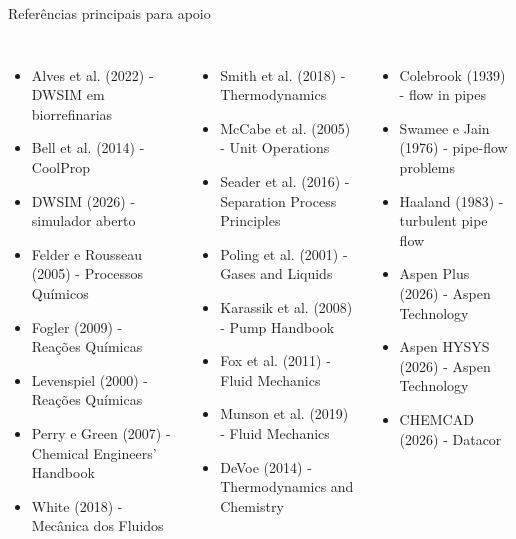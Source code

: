 \begin{frame}{Referências principais para apoio}
  \tiny
  \begin{columns}[T,onlytextwidth]
      \begin{itemize}\setlength{\itemsep}{0.15em}
        \item Alves et al. (2022) - DWSIM em biorrefinarias
        \item Bell et al. (2014) - CoolProp
        \item DWSIM (2026) - simulador aberto
        \item Felder e Rousseau (2005) - Processos Químicos
        \item Fogler (2009) - Reações Químicas
        \item Levenspiel (2000) - Reações Químicas
        \item Perry e Green (2007) - Chemical Engineers' Handbook
        \item White (2018) - Mecânica dos Fluidos
      \end{itemize}
      \begin{itemize}\setlength{\itemsep}{0.15em}
        \item Smith et al. (2018) - Thermodynamics
        \item McCabe et al. (2005) - Unit Operations
        \item Seader et al. (2016) - Separation Process Principles
        \item Poling et al. (2001) - Gases and Liquids
        \item Karassik et al. (2008) - Pump Handbook
        \item Fox et al. (2011) - Fluid Mechanics
        \item Munson et al. (2019) - Fluid Mechanics
        \item DeVoe (2014) - Thermodynamics and Chemistry
      \end{itemize}
      \begin{itemize}\setlength{\itemsep}{0.15em}
        \item Colebrook (1939) - flow in pipes
        \item Swamee e Jain (1976) - pipe-flow problems
        \item Haaland (1983) - turbulent pipe flow
        \item Aspen Plus (2026) - Aspen Technology
        \item Aspen HYSYS (2026) - Aspen Technology
        \item CHEMCAD (2026) - Datacor
      \end{itemize}
  \end{columns}
\end{frame}
